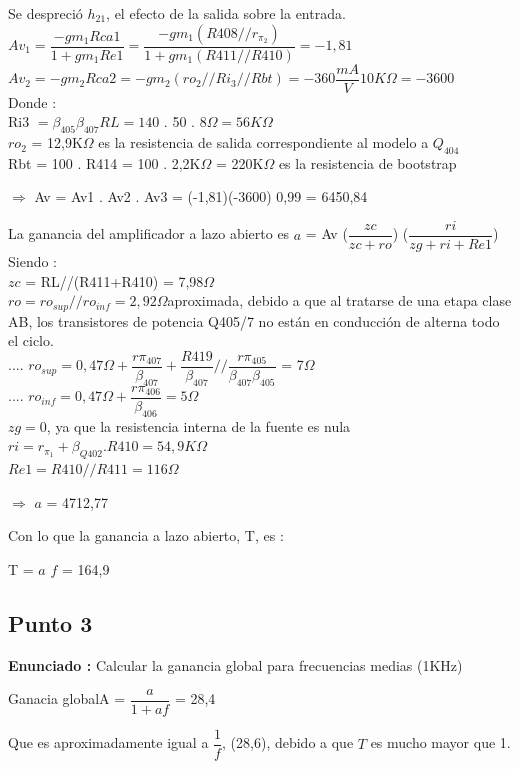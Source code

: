 \documentclass[12pt]{book}
\begin{document}
Se despreció $h_{21}$, el efecto de la salida sobre la entrada.\\[0.5cm]
$Av_{1} = \dfrac{-gm_{1}Rca1}{1+gm_{1} Re1} = \dfrac{-gm_{1}(R408//r_{\pi_2})}{1+gm_{1}(R411//R410)} = -1,81$\\
$Av_{2} = -gm_{2}Rca2 = -gm_{2}(ro_{2}//Ri_{3}//Rbt) = -360\dfrac{mA}{V} 10K\Omega = -3600$\\[0.5cm]
Donde :\\
Ri3 $=\beta_{405} \beta_{407} RL = 140$ . 50 . $8\Omega = 56K\Omega$\\
$ro_{2}$ = 12,9K$\Omega$ es la resistencia de salida correspondiente al modelo a $Q_{404}$\\
Rbt = 100 . R414 = 100 . 2,2K$\Omega$ = 220K$\Omega$ es la resistencia de bootstrap
\begin{center}
$\Longrightarrow$   Av = Av1 . Av2 . Av3 = (-1,81)(-3600) 0,99 = 6450,84\\
\end{center}
La ganancia del amplificador a lazo abierto es  $a$ = Av ($\dfrac{zc}{zc+ro}$) ($\dfrac{ri}{zg+ri+Re1}$)\\
Siendo :\\
$zc$ = RL//(R411+R410) = 7,98$\Omega$\\
$ro=ro_{sup}//ro_{inf}=2,92\Omega$\quad aproximada, debido a que al tratarse de una etapa clase AB, los transistores de potencia Q405/7 no están en conducción de alterna todo el ciclo.\\
.... $ro_{sup} = 0,47\Omega+\dfrac{r\pi_{407}}{\beta_{407}}+\dfrac{R419}{\beta_{407}}//\dfrac{r\pi_{405}}{\beta_{407}\beta_{405}}$ = 7$\Omega$\\
.... $ro_{inf}=0,47\Omega+\dfrac{r\pi_{406}}{\beta_{406}}=5\Omega$\\
$zg=0$, ya que la resistencia interna de la fuente es nula\\
$ri =r_{\pi_1}+\beta_{Q402} . R410=54,9K\Omega$\\
$Re1=R410//R411=116\Omega$
\begin{center}
$\Longrightarrow$   $a$ = 4712,77\\
\end{center}
Con lo que la ganancia a lazo abierto, T, es :
\begin{center}
T = $a$ $f$ = 164,9\\
\end{center}

\subsection{Punto 3}
\textbf{Enunciado : } Calcular la ganancia global para frecuencias medias (1KHz)\\
\begin{center}
Ganacia global\quad A = $\dfrac{a}{1+af}$ = 28,4
\end{center}
Que es aproximadamente igual a $\dfrac{1}{f}$, (28,6), debido a que $T$ es mucho mayor que 1.
\end{document}

